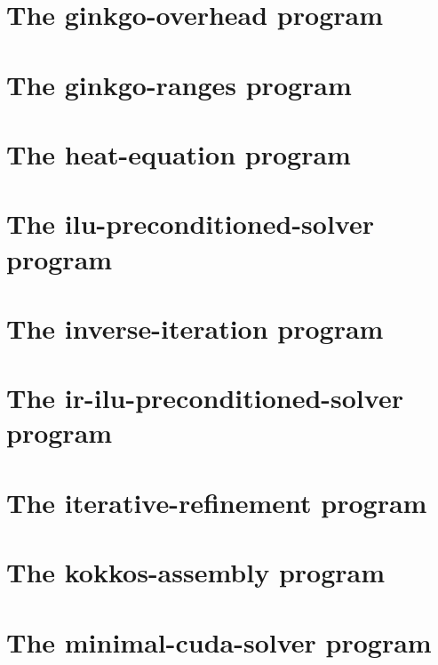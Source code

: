 \let\mypdfximage\pdfximage\def\pdfximage{\immediate\mypdfximage}\documentclass[twoside]{book}
\newcommand{\+}{\discretionary{\mbox{\scriptsize$\hookleftarrow$}}{}{}}
\begin{document}
\chapter{The ginkgo-\/overhead program}
\label{ginkgo_overhead}

\chapter{The ginkgo-\/ranges program}
\label{ginkgo_ranges}

\chapter{The heat-\/equation program}
\label{heat_equation}

\chapter{The ilu-\/preconditioned-\/solver program}
\label{ilu_preconditioned_solver}

\chapter{The inverse-\/iteration program}
\label{inverse_iteration}

\chapter{The ir-\/ilu-\/preconditioned-\/solver program}
\label{ir_ilu_preconditioned_solver}

\chapter{The iterative-\/refinement program}
\label{iterative_refinement}

\chapter{The kokkos-\/assembly program}
\label{kokkos_assembly}

\chapter{The minimal-\/cuda-\/solver program}
\label{minimal_cuda_solver}

\end{document}
